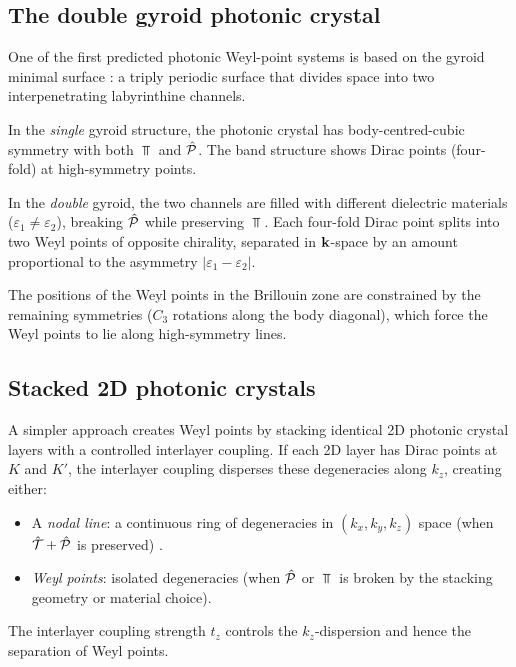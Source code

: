 \subsection{The double gyroid photonic crystal}
\label{sec:ch15-gyroid}

One of the first predicted photonic Weyl-point systems is based on the
gyroid minimal surface \cite{ozawa2018topological,liu2021observation}: a triply periodic surface that divides space
into two interpenetrating labyrinthine channels.

In the \emph{single} gyroid structure, the photonic crystal has
body-centred-cubic symmetry with both $\Top$ and $\hat{\mathcal{P}}$.  The band
structure shows Dirac points (four-fold) at high-symmetry points.

In the \emph{double} gyroid, the two channels are filled with different
dielectric materials ($\varepsilon_1\neq\varepsilon_2$), breaking
$\hat{\mathcal{P}}$ while preserving $\Top$.  Each four-fold Dirac point splits into
two Weyl points of opposite chirality, separated in $\mathbf{k}$-space by an
amount proportional to the asymmetry $|\varepsilon_1-\varepsilon_2|$.

The positions of the Weyl points in the Brillouin zone are constrained
by the remaining symmetries ($C_3$ rotations along the body diagonal),
which force the Weyl points to lie along high-symmetry lines.

\subsection{Stacked 2D photonic crystals}
\label{sec:ch15-stacked}

A simpler approach creates Weyl points by stacking identical 2D
photonic crystal layers with a controlled interlayer coupling.  If each
2D layer has Dirac points at $K$ and $K'$, the interlayer coupling
disperses these degeneracies along $k_z$, creating either:
\begin{itemize}
  \item A \emph{nodal line}: a continuous ring of degeneracies in
  $(k_x,k_y,k_z)$ space (when $\hat{\mathcal{T}}+\hat{\mathcal{P}}$ is preserved)
\cite{kawabata2019symmetry}.
  \item \emph{Weyl points}: isolated degeneracies (when $\hat{\mathcal{P}}$ or
  $\Top$ is broken by the stacking geometry or material choice).
\end{itemize}

The interlayer coupling strength $t_z$ controls the $k_z$-dispersion
and hence the separation of Weyl points.

